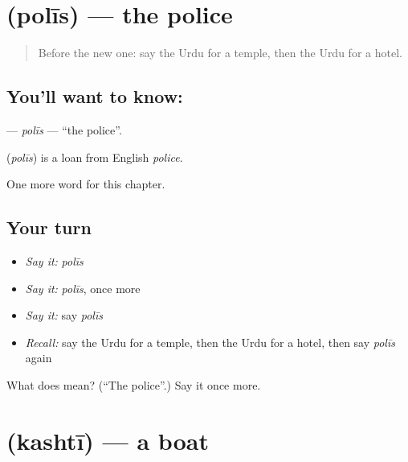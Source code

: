 \section[\texorpdfstring{\ur{پولیس} (polīs)}{پولیس (polīs)}]{ (polīs) — the police}

\label{lesson:UR-C81-polis}



\begin{quote}
Before the new one: say the Urdu for a temple, then the Urdu for a hotel.
\end{quote}

\subsection*{You'll want to know: }
\textbf{} — \emph{polīs} — \textquotedblleft{}the police\textquotedblright{}.

\begin{cousinweb}
\textbf{} (\emph{polīs}) is a loan from English \emph{police}.
\end{cousinweb}

\begin{grammarlens}[title={What you've built}]
One more word for this chapter.
\end{grammarlens}

\subsection*{Your turn}
\begin{itemize}
\raggedright
  \item \emph{Say it:} \emph{polīs}
  \item \emph{Say it:} \emph{polīs}, once more
  \item \emph{Say it:} say \emph{polīs}
  \item \emph{Recall:} say the Urdu for a temple, then the Urdu for a hotel, then say \emph{polīs} again
\end{itemize}

\begin{tcolorbox}[breakable,colback=teal!4,colframe=teal!35!black,title={Before you move on}]
What does  mean? (\textquotedblleft{}The police\textquotedblright{}.) Say it once more.
\end{tcolorbox}
\section[\texorpdfstring{\ur{کشتی} (kashtī)}{کشتی (kashtī)}]{ (kashtī) — a boat}

